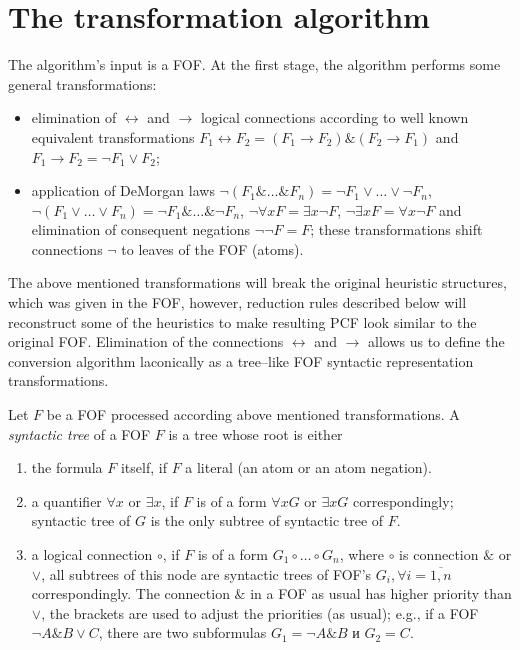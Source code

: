 \documentclass[a4paper,12pt]{article}
\begin{document}
\section{The transformation algorithm}


The algorithm's input is a FOF.  At the first stage, the algorithm performs some general transformations:
\begin{itemize}
\item elimination of $\leftrightarrow$ and $\rightarrow$ logical connections according to well known equivalent transformations $F_1\leftrightarrow F_2 = (F_1\rightarrow F_2)\&(F_2\rightarrow F_1)$ and $F_1\rightarrow F_2 = \neg F_1 \vee F_2$;
\item application of DeMorgan laws $\neg (F_1\&\ldots\& F_n)=\neg F_1\vee\ldots\vee\neg F_n$, $\neg (F_1\vee\ldots\vee F_n)=\neg F_1\&\ldots\&\neg F_n$, $\neg\forall x F = \exists x \neg F$, $\neg\exists x F = \forall x \neg F$ and elimination of consequent negations $\neg\neg F = F$; these transformations shift connections $\neg$ to leaves of the FOF (atoms).
\end{itemize}
The above mentioned transformations will break the original heuristic structures, which was given in the FOF, however, reduction rules described below will reconstruct some of the heuristics to make resulting PCF look similar to the original FOF.  Elimination of the connections $\leftrightarrow$ and $\rightarrow$ allows us to define the conversion algorithm laconically as a tree--like FOF syntactic representation transformations.

Let $F$ be a FOF processed according above mentioned transformations.  A \emph{syntactic tree} of a FOF $F$ is a tree whose root is either
\begin{enumerate}
\item the formula $F$ itself, if $F$ a literal (an atom or an atom negation).
\item a quantifier $\forall x$ or $\exists x$, if $F$ is of a form $\forall x G$ or $\exists x G$ correspondingly; syntactic tree of $G$ is the only subtree of syntactic tree of $F$.
\item a logical connection $\circ$, if $F$ is of a form $G_1\circ\ldots\circ G_n$, where $\circ$ is connection $\&$ or $\vee$, all subtrees of this node are syntactic trees of FOF's $G_i, \forall i=\overline{1,n}$ correspondingly.  The connection $\&$ in a FOF as usual has higher priority than $\vee$, the brackets are used to adjust the priorities (as usual); e.g., if a FOF $\neg A \& B \vee C$, there are two subformulas $G_1 = \neg A\& B$ и $G_2 = C$.
\end{enumerate}
\end{document}
